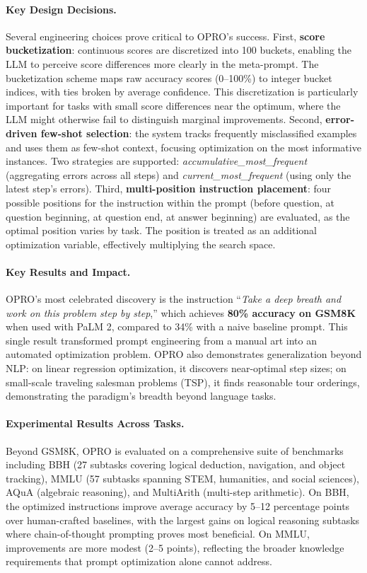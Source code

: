 \paragraph{Key Design Decisions.}
Several engineering choices prove critical to OPRO's success. First, \textbf{score bucketization}: continuous scores are discretized into 100 buckets, enabling the LLM to perceive score differences more clearly in the meta-prompt. The bucketization scheme maps raw accuracy scores (0--100\%) to integer bucket indices, with ties broken by average confidence. This discretization is particularly important for tasks with small score differences near the optimum, where the LLM might otherwise fail to distinguish marginal improvements. Second, \textbf{error-driven few-shot selection}: the system tracks frequently misclassified examples and uses them as few-shot context, focusing optimization on the most informative instances. Two strategies are supported: \textit{accumulative\_most\_frequent} (aggregating errors across all steps) and \textit{current\_most\_frequent} (using only the latest step's errors). Third, \textbf{multi-position instruction placement}: four possible positions for the instruction within the prompt (before question, at question beginning, at question end, at answer beginning) are evaluated, as the optimal position varies by task. The position is treated as an additional optimization variable, effectively multiplying the search space.

\paragraph{Key Results and Impact.}
OPRO's most celebrated discovery is the instruction ``\textit{Take a deep breath and work on this problem step by step},'' which achieves \textbf{80\% accuracy on GSM8K} when used with PaLM 2, compared to 34\% with a naive baseline prompt. This single result transformed prompt engineering from a manual art into an automated optimization problem. OPRO also demonstrates generalization beyond NLP: on linear regression optimization, it discovers near-optimal step sizes; on small-scale traveling salesman problems (TSP), it finds reasonable tour orderings, demonstrating the paradigm's breadth beyond language tasks.

\paragraph{Experimental Results Across Tasks.}
Beyond GSM8K, OPRO is evaluated on a comprehensive suite of benchmarks including BBH (27 subtasks covering logical deduction, navigation, and object tracking), MMLU (57 subtasks spanning STEM, humanities, and social sciences), AQuA (algebraic reasoning), and MultiArith (multi-step arithmetic). On BBH, the optimized instructions improve average accuracy by 5--12 percentage points over human-crafted baselines, with the largest gains on logical reasoning subtasks where chain-of-thought prompting proves most beneficial. On MMLU, improvements are more modest (2--5 points), reflecting the broader knowledge requirements that prompt optimization alone cannot address.

